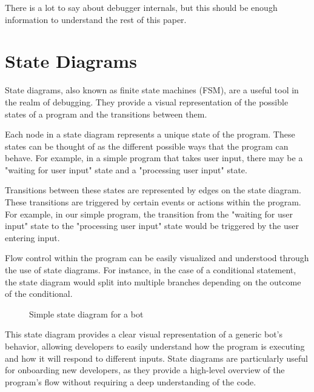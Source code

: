There is a lot to say about debugger internals, but this should be enough information to understand the rest of this paper. 

\section{State Diagrams}
State diagrams, also known as finite state machines (FSM), are a useful tool in the realm of debugging. They provide a visual representation of the possible states of a program and the transitions between them.

Each node in a state diagram represents a unique state of the program. These states can be thought of as the different possible ways that the program can behave. For example, in a simple program that takes user input, there may be a "waiting for user input" state and a "processing user input" state.

Transitions between these states are represented by edges on the state diagram. These transitions are triggered by certain events or actions within the program. For example, in our simple program, the transition from the "waiting for user input" state to the "processing user input" state would be triggered by the user entering input.

Flow control within the program can be easily visualized and understood through the use of state diagrams. For instance, in the case of a conditional statement, the state diagram would split into multiple branches depending on the outcome of the conditional.

\begin{figure}
\centering
{}
\caption{Simple state diagram for a bot}
\end{figure}

This state diagram provides a clear visual representation of a generic bot's behavior, allowing developers to easily understand how the program is executing and how it will respond to different inputs. State diagrams are particularly useful for onboarding new developers, as they provide a high-level overview of the program's flow without requiring a deep understanding of the code.


